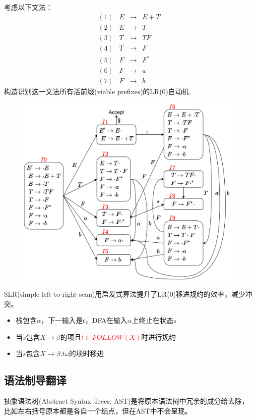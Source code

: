 \begin{example}[用NFA识别活前缀]
考虑以下文法：
\[\begin{array}{rrll}
(1) & E &\to & E+T\\
(2) & E &\to & T\\
(3) & T &\to & TF\\
(4) & T &\to & F\\
(5) & F &\to & F^*\\
(6) & F &\to & a\\
(7) & F &\to & b
\end{array}\]
构造识别这一文法所有活前缀(viable prefixes)的LR(0)自动机.
\begin{figure}[H]
\centering
\includegraphics[width=0.8\linewidth]{fig/T06.pdf}
\end{figure}
\end{example}

SLR(simple left-to-right scan)用启发式算法提升了LR(0)移进规约的效率，减少冲突。
\begin{itemize}
	\item 栈包含$\alpha$，下一输入是$t$，DFA在输入$\alpha$上终止在状态$s$
	\item 当$s$包含$X\to\beta$的项且\textcolor{red}{$t\in FOLLOW(X)$}时进行规约
	\item 当$s$包含$X\to\beta.t\omega$的项时移进
\end{itemize}

\subsection{语法制导翻译}
抽象语法树(Abstract Syntax Trees, AST)是将原本语法树中冗余的成分给去除，比如左右括号原本都是各自一个结点，但在AST中不会呈现。

